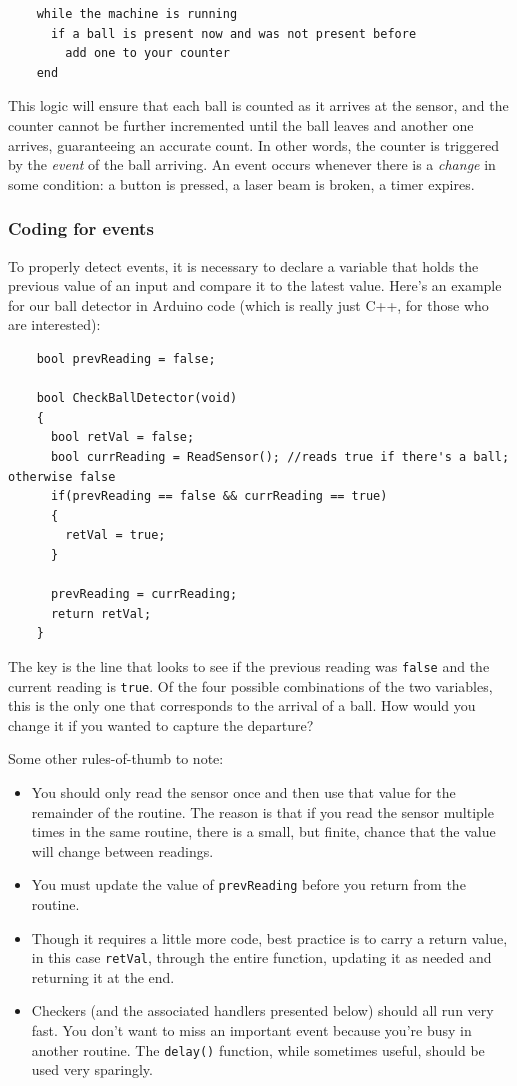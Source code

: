 \documentclass[11pt]{article} %
\begin{document}
\begin{verbatim}
    while the machine is running
      if a ball is present now and was not present before
        add one to your counter
    end

\end{verbatim}

This logic will ensure that each ball is counted as it arrives at the sensor, and the counter cannot be further incremented until the ball leaves and another one arrives, guaranteeing an accurate count. In other words, the counter is triggered by the \emph{event} of the ball arriving. An event occurs whenever there is a \emph{change} in some condition: a button is pressed, a laser beam is broken, a timer expires.

\subsubsection*{Coding for events}

To properly detect events, it is necessary to declare a variable that holds the previous value of an input and compare it to the latest value. Here’s an example for our ball detector in Arduino code (which is really just C++, for those who are interested):

\begin{verbatim}
    bool prevReading = false;
    
    bool CheckBallDetector(void)
    {
      bool retVal = false;
      bool currReading = ReadSensor(); //reads true if there's a ball; otherwise false
      if(prevReading == false && currReading == true)
      {
        retVal = true;
      }
    
      prevReading = currReading;
      return retVal;
    }
\end{verbatim}

The key is the line that looks to see if the previous reading was \verb|false| and the current reading is \verb|true|. Of the four possible combinations of the two variables, this is the only one that corresponds to the arrival of a ball. How would you change it if you wanted to capture the departure?

Some other rules-of-thumb to note:
\begin{itemize}
\item You should only read the sensor once and then use that value for the remainder of the routine. The reason is that if you read the sensor multiple times in the same routine, there is a small, but finite, chance that the value will change between readings.
\item You must update the value of \verb|prevReading| before you return from the routine. 
\item Though it requires a little more code, best practice is to carry a return value, in this case \verb|retVal|, through the entire function, updating it as needed and returning it at the end.
\item Checkers (and the associated handlers presented below) should all run very fast. You don't want to miss an important event because you're busy in another routine. The \verb|delay()| function, while sometimes useful, should be used very sparingly.
\end{itemize}
\end{document}
